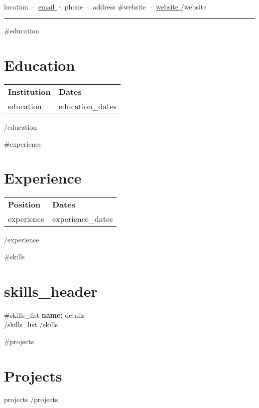 \documentclass[a4paper,11pt]{article}
\begin{document}
\begin{center}
    {\Huge {}} \\
    {\small {{location}} · \href{mailto:{{email}}}{ {{email}} } · {{phone}} · {{address}}
    {{#website}} · \href{ {{website}} }{ {{website}} } {{/website}}}
    \\\vspace{0.5cm}
    \hrule
\end{center}

{{#education}}
\section*{Education}
\begin{longtable}{p{} p{}}
    \textbf{Institution} & \textbf{Dates} \\
    {{education}} & {{education_dates}} \\
\end{longtable}
{{/education}}

{{#experience}}
\section*{Experience}
\begin{longtable}{p{} p{}}
    \textbf{Position} & \textbf{Dates} \\
    {{experience}} & {{experience_dates}} \\
\end{longtable}
{{/experience}}

{{#skills}}
\section*{ {{skills_header}} }
{{#skills_list}}
\textbf{ {{name}}:} {{details}} \\
{{/skills_list}}
{{/skills}}

{{#projects}}
\section*{Projects}
{{projects}}
{{/projects}}
\end{document}

